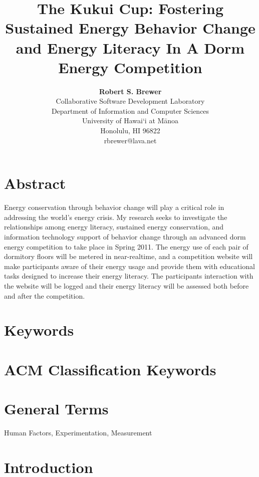 \documentclass{chi-ext}
\title{The Kukui Cup: Fostering Sustained Energy Behavior Change and Energy Literacy In A Dorm Energy Competition}
\author{
  \textbf{Robert S. Brewer}\\
  Collaborative Software Development Laboratory\\
  Department of Information and Computer Sciences\\
  University of Hawai`i at M\=anoa\\
  Honolulu, HI 96822\\
  rbrewer@lava.net\\
}
\begin{document}
\maketitle

\begin{multicols}{2}
  
\makeauthors

\section{Abstract}

Energy conservation through behavior change will play a critical role in addressing the world's energy crisis. My research seeks to investigate the relationships among energy literacy, sustained energy conservation, and information technology support of behavior change through an advanced dorm energy competition to take place in Spring 2011. The energy use of each pair of dormitory floors will be metered in near-realtime, and a competition website will make participants aware of their energy usage and provide them with educational tasks designed to increase their energy literacy. The participants interaction with the website will be logged and their energy literacy will be assessed both before and after the competition.

\section{Keywords}
\makeatletter \@keywords \makeatother

\makecopyright

\section{ACM Classification Keywords}
\makeatletter \@acmclassification \makeatother


\section{General Terms}

Human Factors, Experimentation, Measurement

\section{Introduction}


\end{multicols}
\end{document}
